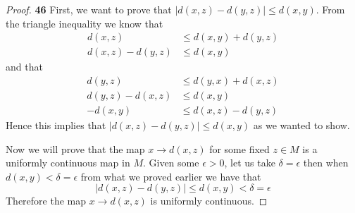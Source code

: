 \documentclass[11pt]{article}
\theoremstyle{definition}
\begin{document}
    \begin{proof}{\textbf{46}}
        First, we want to prove that $|d(x,z) - d(y,z)| \leq d(x,y)$. From the
        triangle inequality we know that
        \begin{align*}
            d(x,z) &\leq d(x,y) + d(y,z)\\
            d(x,z) - d(y,z) &\leq d(x,y)
        \end{align*}
        and that
        \begin{align*}
            d(y,z) &\leq d(y,x) + d(x,z)\\
            d(y,z) - d(x,z) &\leq d(x,y)\\
            -d(x,y) &\leq d(x,z) - d(y,z) 
        \end{align*}
        Hence this implies that $|d(x,z) - d(y,z)| \leq d(x,y)$ as we wanted to
        show.

        Now we will prove that the map $x \to d(x,z)$ for some fixed
        $z \in M$ is a uniformly continuous map in $M$.
        Given some $\epsilon > 0$, let us take $\delta = \epsilon$ then when
        $d(x,y) < \delta = \epsilon$ from what we proved earlier we have that
        $$|d(x,z) - d(y,z)| \leq d(x,y) < \delta = \epsilon$$
        Therefore the map $x \to d(x,z)$ is uniformly continuous.
    \end{proof}
\cleardoublepage
\end{document}
